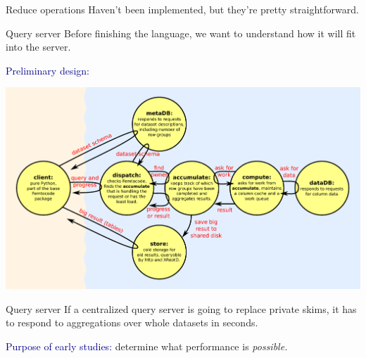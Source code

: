 \documentclass{beamer}
\begin{document}
\begin{frame}{Reduce operations}
Haven't been implemented, but they're pretty straightforward.
\end{frame}

\begin{frame}{Query server}
\vspace{0.4 cm}
Before finishing the language, we want to understand how it will fit into the server.

\vspace{0.2 cm}
\textcolor{darkblue}{Preliminary design:}

\vspace{0.2 cm}
\includegraphics[width=\linewidth]{distributed-system.pdf}
\end{frame}

\begin{frame}{Query server}
If a centralized query server is going to replace private skims, it has to respond to aggregations over whole datasets in seconds.

\vfill
\textcolor{darkblue}{Purpose of early studies:} determine what performance is {\it possible.}
\end{frame}
\end{document}
